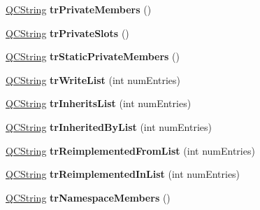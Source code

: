 \begin{DoxyCompactItemize}
\mbox{\label{class_translator_slovene_a5e547285add6577c8cc24fac9cc6cfc3}} 
\mbox{\hyperlink{class_q_c_string}{Q\+C\+String}} {\bfseries tr\+Private\+Members} ()
\item 
\mbox{\label{class_translator_slovene_aee285dc80c56037f4ea97e1380c9e689}} 
\mbox{\hyperlink{class_q_c_string}{Q\+C\+String}} {\bfseries tr\+Private\+Slots} ()
\item 
\mbox{\label{class_translator_slovene_abe8c003cd38ada0b4161776e1e8b9a69}} 
\mbox{\hyperlink{class_q_c_string}{Q\+C\+String}} {\bfseries tr\+Static\+Private\+Members} ()
\item 
\mbox{\label{class_translator_slovene_a7f42097716abdf4cf2799ed13ffcdf11}} 
\mbox{\hyperlink{class_q_c_string}{Q\+C\+String}} {\bfseries tr\+Write\+List} (int num\+Entries)
\item 
\mbox{\label{class_translator_slovene_ab41bd7de2c553391c190936ab6ba722e}} 
\mbox{\hyperlink{class_q_c_string}{Q\+C\+String}} {\bfseries tr\+Inherits\+List} (int num\+Entries)
\item 
\mbox{\label{class_translator_slovene_ad16a0cb5a4e60b7324dc4e8b81754ca8}} 
\mbox{\hyperlink{class_q_c_string}{Q\+C\+String}} {\bfseries tr\+Inherited\+By\+List} (int num\+Entries)
\item 
\mbox{\label{class_translator_slovene_ae699d7529cb4628eeb5ebb3b8182ee6d}} 
\mbox{\hyperlink{class_q_c_string}{Q\+C\+String}} {\bfseries tr\+Reimplemented\+From\+List} (int num\+Entries)
\item 
\mbox{\label{class_translator_slovene_af67a28410dd5ffe60cc2c2c316dbc47b}} 
\mbox{\hyperlink{class_q_c_string}{Q\+C\+String}} {\bfseries tr\+Reimplemented\+In\+List} (int num\+Entries)
\item 
\mbox{\label{class_translator_slovene_a5574443df8bbdc477f38855490f9c0b4}} 
\mbox{\hyperlink{class_q_c_string}{Q\+C\+String}} {\bfseries tr\+Namespace\+Members} ()
\item 

\end{DoxyCompactItemize}
